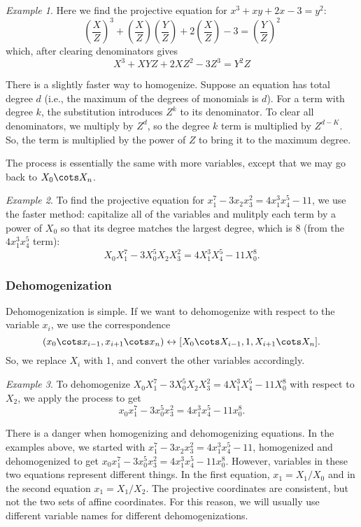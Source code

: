 \documentclass[12pt]{amsart}
\theoremstyle{plain}
\theoremstyle{definition}
\theoremstyle{remark}
\newtheorem*{exam}{Example}
\begin{document}
\begin{exam}
  Here we find the projective equation for $x^3+xy+2x -3=y^2$:
  \[ \left(\frac X Z\right)^3 + \left(\frac X Z\right) \left(\frac Y
    Z\right) +2 \left(\frac X Z\right) - 3 = \left(\frac Y Z\right)^2
\]
 which, after clearing denominators gives
\[X^3+XYZ + 2XZ^2 -3Z^3 = Y^2Z\]
\end{exam}

There is a slightly faster way to homogenize.  Suppose an equation has
total degree $d$ (i.e., the maximum of the degrees of monomials is
$d$).  For a term with degree $k$, the substitution introduces $Z^k$
to its denominator.  To clear all denominators, we multiply by $Z^d$,
so the degree $k$ term is multiplied by $Z^{d-K}$.  So, the term is
multiplied by the power of $Z$ to bring it to the maximum degree.

The process is essentially the same with more variables, except that
we may go back to $X_0\cots X_n$.
\begin{exam}
  To find the projective equation for
  $x_1^7-3x_2x_3^2=4x_1^3x_4^5-11$, we use the faster method:
  capitalize all of the variables and mulitply each term by a power of
  $X_0$ so that its degree matches the largest degree, which is $8$
  (from the $4x_1^3x_4^5$ term):
  \[ X_0X_1^7-3X_0^5X_2X_3^2=4X_1^3X_4^5-11X_0^8.\]
\end{exam}
\subsubsection{Dehomogenization}
Dehomogenization is simple.  If we want to dehomogenize with respect
to the variable $x_i$, we use the correspondence
\[ (x_0\cots x_{i-1}, x_{i+1}\cots x_n) \leftrightarrow [X_0\cots
X_{i-1},1,X_{i+1}\cots X_n].\]
So, we replace $X_i$ with $1$, and convert the other variables
accordingly.
\begin{exam}
  To dehomogenize $ X_0X_1^7-3X_0^5X_2X_3^2=4X_1^3X_4^5-11X_0^8$ with
  respect to $X_2$, we apply the process to get
  \[ x_0x_1^7-3x_0^5x_3^2=4x_1^3x_4^5-11x_0^8.\]
\end{exam}

There is a danger when homogenizing and dehomogenizing equations.  In
the examples above, we started with $x_1^7-3x_2x_3^2=4x_1^3x_4^5-11$,
homogenized and dehomogenized to get
$x_0x_1^7-3x_0^5x_3^2=4x_1^3x_4^5-11x_0^8$.  However, variables in
these two equations represent different things.  In the first
equation, $x_1=X_1/X_0$ and in the second equation $x_1=X_1/X_2$.  The
projective coordinates are consistent, but not the two sets of affine
coordinates.  For this reason, we will usually use different variable
names for different dehomogenizations.
\end{document}
